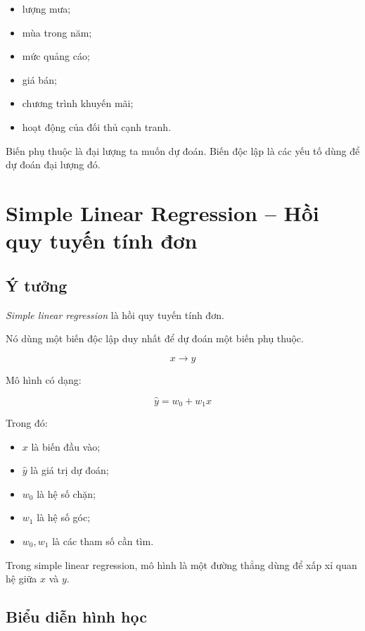 \begin{itemize}
    \item lượng mưa;
    \item mùa trong năm;
    \item mức quảng cáo;
    \item giá bán;
    \item chương trình khuyến mãi;
    \item hoạt động của đối thủ cạnh tranh.
\end{itemize}

\begin{ghinho}
Biến phụ thuộc là đại lượng ta muốn dự đoán. Biến độc lập là các yếu tố dùng để dự đoán đại lượng đó.
\end{ghinho}

\section{Simple Linear Regression -- Hồi quy tuyến tính đơn}

\subsection{Ý tưởng}

\textit{Simple linear regression} là hồi quy tuyến tính đơn.

Nó dùng một biến độc lập duy nhất để dự đoán một biến phụ thuộc.

\[
    x \rightarrow y
\]

Mô hình có dạng:

\[
    \hat{y} = w_0 + w_1x
\]

Trong đó:

\begin{itemize}
    \item $x$ là biến đầu vào;
    \item $\hat{y}$ là giá trị dự đoán;
    \item $w_0$ là hệ số chặn;
    \item $w_1$ là hệ số góc;
    \item $w_0,w_1$ là các tham số cần tìm.
\end{itemize}

\begin{ghinho}
Trong simple linear regression, mô hình là một đường thẳng dùng để xấp xỉ quan hệ giữa $x$ và $y$.
\end{ghinho}

\subsection{Biểu diễn hình học}

